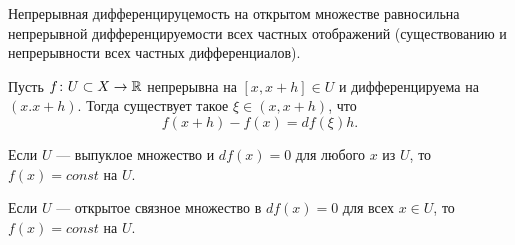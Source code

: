 \begin{cor}
    Непрерывная дифференцируцемость на открытом множестве равносильна непрерывной дифференцируемости всех частных отображений (существованию и непрерывности всех частных дифференциалов). 
\end{cor}
\begin{thm}
    Пусть $ f\colon U \subset X \to  \mathbb{R}$ непрерывна на $ [x, x+h] \in U$ и дифференцируема на $ (x. x+h)$. Тогда существует такое  $ \xi \in (x, x+h)$, что
    \[
	f(x+h) - f(x) = df(\xi )h
    .\] 
\end{thm}
\begin{cor}
    Если $ U$ --- выпуклое множество и $ df(x) = 0$ для любого $ x$ из  $ U$, то  $ f(x) = const$ на  $ U$. 
\end{cor}
\begin{cor}
    Если $ U$ --- открытое связное множество в  $ df(x) = 0$ для всех  $ x \in  U$, то $ f(x) = const$ на  $ U$. 
\end{cor}
% 
